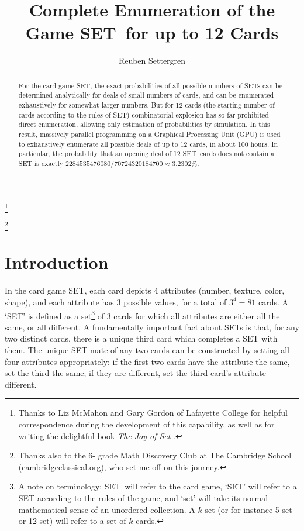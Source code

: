 \documentclass[10pt]{amsart}
\newcommand{\SETb}{SET\texttrademark\ } %
\newcommand{\SET}{SET\texttrademark}  %
\begin{document}
\title[SET Enumeration]{Complete Enumeration of the Game \SETb for up to 12 Cards}
\author[Settergren]{Reuben Settergren}

\thanks{Thanks to Liz McMahon and Gary Gordon of Lafayette College for helpful
  correspondence during the development of this capability, as well as for
  writing the delightful book {\em The Joy of Set} \cite{JOS}.}

\thanks{Thanks also to the 6- grade Math Discovery Club at The Cambridge
  School (\url{cambridgeclassical.org}), who set me off on this journey.}

\maketitle

\begin{abstract}
For the card game \SET, the exact probabilities of all possible numbers of SETs
can be determined analytically for deals of small numbers of cards, and can be
enumerated exhaustively for somewhat larger numbers. But for 12 cards (the
starting number of cards according to the rules of \SET) combinatorial explosion
has so far prohibited direct enumeration, allowing only estimation of
probabilities by simulation. In this result, massively parallel programming on a
Graphical Processing Unit (GPU) is used to exhaustively enumerate all possible
deals of up to 12 cards, in about 100 hours. In particular, the probability that
an opening deal of 12 \SETb cards does not contain a SET is exactly
$2284535476080/70724320184700 \approx 3.2302\%$.
\end{abstract}

\section{Introduction}
In the card game \SET\cite{SET}, each card depicts 4 attributes (number,
texture, color, shape), and each attribute has 3 possible values, for a total of
$3^4=81$ cards. A `SET' is defined as a set\footnote{A note on terminology:
  \SETb will refer to the card game, `SET' will refer to a SET according to the
  rules of the game, and `set' will take its normal mathematical sense of an
  unordered collection. A $k$-set (or for instance 5-set or 12-set) will refer
  to a set of $k$ cards.} of 3 cards for which all attributes are either all the
same, or all different. A fundamentally important fact about SETs is that, for
any two distinct cards, there is a unique third card which completes a SET with
them. The unique SET-mate of any two cards can be constructed by setting all
four attributes appropriately: if the first two cards have the attribute the
same, set the third the same; if they are different, set the third card's
attribute different.
\end{document}
